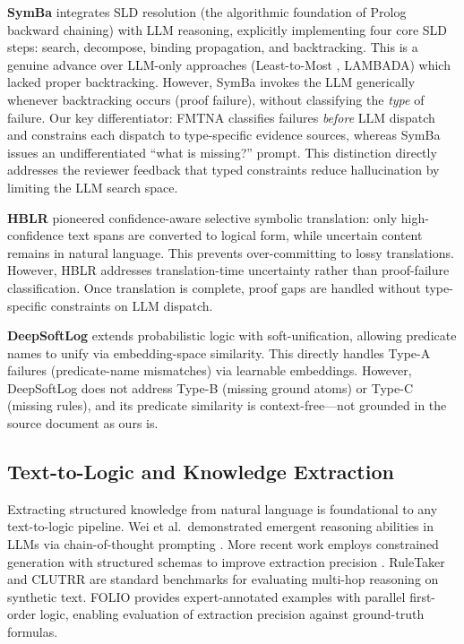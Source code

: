\documentclass[11pt,letterpaper]{article}
\begin{document}
\textbf{SymBa} \citep{Lee2024} integrates SLD resolution (the algorithmic foundation of Prolog backward chaining) with LLM reasoning, explicitly implementing four core SLD steps: search, decompose, binding propagation, and backtracking. This is a genuine advance over LLM-only approaches (Least-to-Most \citep{Zhou2022}, LAMBADA) which lacked proper backtracking. However, SymBa invokes the LLM generically whenever backtracking occurs (proof failure), without classifying the \emph{type} of failure. Our key differentiator: FMTNA classifies failures \emph{before} LLM dispatch and constrains each dispatch to type-specific evidence sources, whereas SymBa issues an undifferentiated ``what is missing?'' prompt. This distinction directly addresses the reviewer feedback that typed constraints reduce hallucination by limiting the LLM search space.

\textbf{HBLR} \citep{Li2025} pioneered confidence-aware selective symbolic translation: only high-confidence text spans are converted to logical form, while uncertain content remains in natural language. This prevents over-committing to lossy translations. However, HBLR addresses translation-time uncertainty rather than proof-failure classification. Once translation is complete, proof gaps are handled without type-specific constraints on LLM dispatch.

\textbf{DeepSoftLog} \citep{Sato2023} extends probabilistic logic with soft-unification, allowing predicate names to unify via embedding-space similarity. This directly handles Type-A failures (predicate-name mismatches) via learnable embeddings. However, DeepSoftLog does not address Type-B (missing ground atoms) or Type-C (missing rules), and its predicate similarity is context-free---not grounded in the source document as ours is.

\subsection{Text-to-Logic and Knowledge Extraction}

Extracting structured knowledge from natural language is foundational to any text-to-logic pipeline. Wei et al.\ demonstrated emergent reasoning abilities in LLMs via chain-of-thought prompting \citep{Wei2022}. More recent work employs constrained generation with structured schemas to improve extraction precision \citep{Yao2023,Han2024}. RuleTaker \citep{Clark2020} and CLUTRR \citep{Sinha2019} are standard benchmarks for evaluating multi-hop reasoning on synthetic text. FOLIO \citep{Han2024} provides expert-annotated examples with parallel first-order logic, enabling evaluation of extraction precision against ground-truth formulas.
\end{document}
